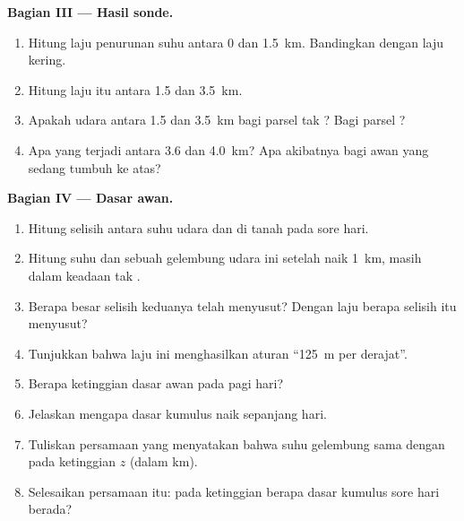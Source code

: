 \begin{problem}
\medskip
\noindent\textbf{Bagian III --- Hasil sonde.}
\begin{enumerate}[resume]
  \item Hitung laju penurunan suhu antara \num{0} dan \qty{1.5}{km}.
        Bandingkan dengan laju kering.
  \item Hitung laju itu antara \num{1.5} dan \qty{3.5}{km}.
  \item Apakah udara antara \num{1.5} dan \qty{3.5}{km}  bagi parsel
        tak ? Bagi parsel ?
  \item Apa yang terjadi antara \num{3.6} dan \qty{4.0}{km}? Apa akibatnya
        bagi awan yang sedang tumbuh ke atas?
\end{enumerate}

\medskip
\noindent\textbf{Bagian IV --- Dasar awan.}
\begin{enumerate}[resume]
  \item Hitung selisih antara suhu udara dan  di tanah pada
        sore hari.
  \item Hitung suhu dan  sebuah gelembung udara ini setelah naik
        \qty{1}{km}, masih dalam keadaan tak .
  \item Berapa besar selisih keduanya telah menyusut? Dengan laju berapa
        selisih itu menyusut?
  \item Tunjukkan bahwa laju ini menghasilkan aturan ``\qty{125}{m} per
        derajat''.
  \item Berapa ketinggian dasar awan pada pagi hari?
  \item Jelaskan mengapa dasar kumulus naik sepanjang hari.
  \item Tuliskan persamaan yang menyatakan bahwa suhu gelembung sama dengan
         pada ketinggian $z$ (dalam km).
  \item Selesaikan persamaan itu: pada ketinggian berapa dasar kumulus sore
        hari berada?
\end{enumerate}
\end{problem}
